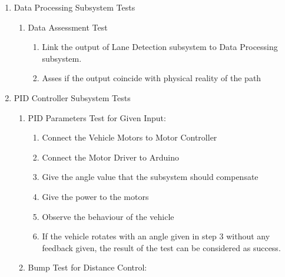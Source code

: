 \documentclass[a4paper,12pt]{article}
\begin{document}
\begin{enumerate}
\item {Data Processing Subsystem Tests}	

\begin{enumerate}

\item Data Assessment Test

\begin{enumerate}

\item Link the output of Lane Detection subsystem to Data Processing subsystem.  

\item Asses if the output coincide with physical reality of the path  

\end{enumerate}


\end{enumerate}







\item {PID Controller Subsystem Tests}	

\begin{enumerate}



\item PID Parameters Test for Given Input:	 \label{test:a}	

\begin{enumerate}

\item Connect the Vehicle Motors to Motor Controller  

\item Connect the Motor Driver to Arduino  

\item Give the angle value that the subsystem should compensate   

\item Give the power to the motors  

\item Observe the behaviour of the vehicle  

\item If the vehicle rotates with an angle given in step 3 without any feedback given, the result of the test can be considered as success.  

\end{enumerate}


\item Bump Test for Distance Control: \label{test:b}	


\end{enumerate}
\end{enumerate}
\end{document}
